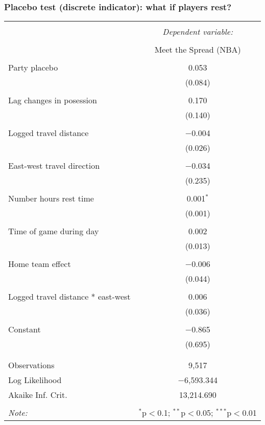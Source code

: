 \documentclass{beamer}
\begin{document}
\begin{frame}
{}   
\end{frame}

\begin{frame}   \frametitle{Placebo test (discrete indicator): what if players rest?}
  \centering
  \tiny{ %
\begin{tabular}{@{\extracolsep{5pt}}lc}  \\[-1.8ex]\hline  \hline \\[-1.8ex]   & \multicolumn{1}{c}{\textit{Dependent variable:}} \\  \cline{2-2}  \\[-1.8ex] & Meet the Spread (NBA) \\  \hline \\[-1.8ex]   Party placebo & 0.053 \\    & (0.084) \\    & \\   Lag changes in posession & 0.170 \\    & (0.140) \\    & \\   Logged travel distance & $-$0.004 \\    & (0.026) \\    & \\   East-west travel direction & $-$0.034 \\    & (0.235) \\    & \\   Number hours rest time & 0.001$^{*}$ \\    & (0.001) \\    & \\   Time of game during day & 0.002 \\    & (0.013) \\    & \\   Home team effect & $-$0.006 \\    & (0.044) \\    & \\   Logged travel distance * east-west & 0.006 \\    & (0.036) \\    & \\   Constant & $-$0.865 \\    & (0.695) \\    & \\  \hline \\[-1.8ex]  Observations & 9,517 \\  Log Likelihood & $-$6,593.344 \\  Akaike Inf. Crit. & 13,214.690 \\  \hline  \hline \\[-1.8ex]  \textit{Note:}  & \multicolumn{1}{r}{$^{*}$p$<$0.1; $^{**}$p$<$0.05; $^{***}$p$<$0.01} \\  \end{tabular} 
      }
\end{frame}
\end{document}
